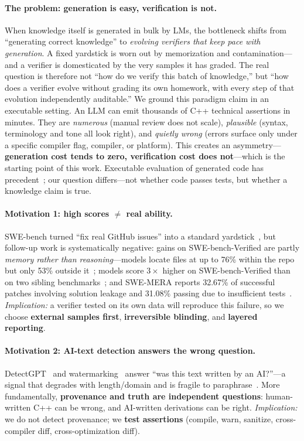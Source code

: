 \documentclass{article}
\begin{document}
\paragraph{The problem: generation is easy, verification is not.}
When knowledge itself is generated in bulk by LMs, the bottleneck shifts from ``generating correct
knowledge'' to \emph{evolving verifiers that keep pace with generation}. A fixed yardstick is worn
out by memorization and contamination---and a verifier is domesticated by the very samples it has
graded. The real question is therefore not ``how do we verify this batch of knowledge,'' but
``how does a verifier evolve without grading its own homework, with every step of that evolution
independently auditable.'' We ground this paradigm claim in an executable setting. An LLM can emit
thousands of C++ technical assertions in minutes. They are \emph{numerous}
(manual review does not scale), \emph{plausible} (syntax, terminology and tone all look right),
and \emph{quietly wrong} (errors surface only under a specific compiler flag, compiler, or
platform). This creates an asymmetry---\textbf{generation cost tends to zero, verification cost
does not}---which is the starting point of this work. Executable evaluation of generated code has
precedent~\cite{chen2021humaneval}; our question differs---not whether code passes tests, but
whether a knowledge claim is true.

\paragraph{Motivation 1: high scores $\neq$ real ability.}
SWE-bench turned ``fix real GitHub issues'' into a standard yardstick~\cite{jimenez2024swebench},
but follow-up work is systematically negative: gains on SWE-bench-Verified are partly
\emph{memory rather than reasoning}---models locate files at up to 76\% within the repo but only
53\% outside it~\cite{liang2025illusion}; models score $3\times$ higher on SWE-bench-Verified
than on two sibling benchmarks~\cite{prathifkumar2025verified}; and SWE-MERA reports 32.67\% of
successful patches involving solution leakage and 31.08\% passing due to insufficient
tests~\cite{adamenko2025swemera}. \emph{Implication:} a verifier tested on its own data will
reproduce this failure, so we choose \textbf{external samples first}, \textbf{irreversible
blinding}, and \textbf{layered reporting}.

\paragraph{Motivation 2: AI-text detection answers the wrong question.}
DetectGPT~\cite{mitchell2023detectgpt} and watermarking~\cite{kirchenbauer2023watermark} answer
``was this text written by an AI?''---a signal that degrades with length/domain and is fragile to
paraphrase~\cite{sadasivan2023canai}. More fundamentally, \textbf{provenance and truth are
independent questions}: human-written C++ can be wrong, and AI-written derivations can be right.
\emph{Implication:} we do not detect provenance; we \textbf{test assertions} (compile, warn,
sanitize, cross-compiler diff, cross-optimization diff).
\end{document}
